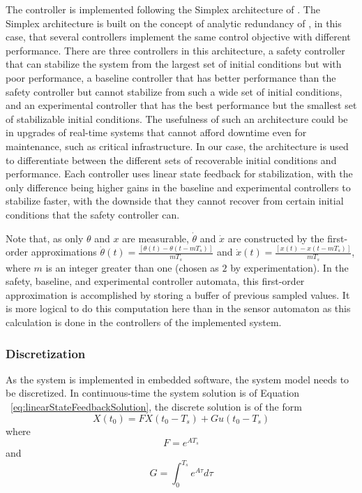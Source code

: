 \documentclass[conference]{IEEEtran}
\begin{document}
The controller is implemented following the Simplex architecture of \cite{ShaACC1998}.  The Simplex architecture is built on the concept of analytic redundancy of \cite{Bodson1994}, in this case, that several controllers implement the same control objective with different performance.  There are three controllers in this architecture, a safety controller that can stabilize the system from the largest set of initial conditions but with poor performance, a baseline controller that has better performance than the safety controller but cannot stabilize from such a wide set of initial conditions, and an experimental controller that has the best performance but the smallest set of stabilizable initial conditions.  The usefulness of such an architecture could be in upgrades of real-time systems that cannot afford downtime even for maintenance, such as critical infrastructure.  In our case, the architecture is used to differentiate between the different sets of recoverable initial conditions and performance.  Each controller uses linear state feedback for stabilization, with the only difference being higher gains in the baseline and experimental controllers to stabilize faster, with the downside that they cannot recover from certain initial conditions that the safety controller can.

Note that, as only $\theta$ and $x$ are measurable, $\dot{\theta}$ and $\dot{x}$ are constructed by the first-order approximations $\dot{\theta}(t)=\frac{[\theta(t)-\theta(t-mT_s)]}{mT_s}$ and $\dot{x}(t)=\frac{[x(t)-x(t-mT_s)]}{mT_s}$, where $m$ is an integer greater than one (chosen as $2$ by experimentation).  In the safety, baseline, and experimental controller automata, this first-order approximation is accomplished by storing a buffer of previous sampled values.  It is more logical to do this computation here than in the sensor automaton as this calculation is done in the controllers of the implemented system.

\subsubsection{Discretization}

As the system is implemented in embedded software, the system model needs to be discretized.  In continuous-time the system solution is of Equation ~\ref{eq:linearStateFeedbackSolution}, the discrete solution is of the form 
\begin{equation}
X\left(t_0\right)=FX\left(t_0-T_s\right)+Gu\left(t_0-T_s\right)
\label{eq:discreteSolution}
\end{equation}
where
\begin{equation}
F=e^{AT_s}
\label{eq:discreteLinearStateFeedbackSolutionF}
\end{equation}
and
\begin{equation}
G=\int^{T_s}_0 e^{A\tau}d\tau
\label{discreteLinearStateFeedbackSolutionG}
\end{equation}
\end{document}
